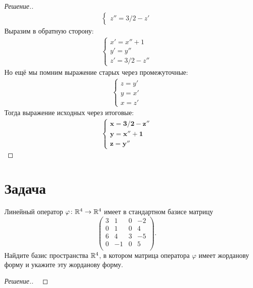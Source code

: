 \documentclass[a4paper]{article}
\theoremstyle{remark}
\begin{document}
\begin{proof}[Решение.]
\begin{align*}
\begin{cases}
            z'' = 3/2 - z'
          \end{cases}
        \end{align*}
        Выразим в обратную сторону:
        \begin{align*}
          \begin{cases}
            x' = x'' + 1 \\
            y' = y'' \\
            z' = 3/2 - z''
          \end{cases}
        \end{align*}
        Но ещё мы помним выражение старых через промежуточные:
        \begin{align*}
          \begin{cases}
            z = y' \\
            y = x' \\
            x = z'
          \end{cases}
        \end{align*}
        Тогда выражение исходных через итоговые:
        \begin{align*}
          \begin{cases}
            \bm{x = 3/2 - z''} \\
            \bm{y = x'' + 1} \\
            \bm{z = y''}
          \end{cases}
        \end{align*}        
        \end{proof}

    \section*{Задача }
        Линейный оператор $\varphi \colon \mathbb{R}^4 \to \mathbb{R}^4$ имеет в стандартном базисе матрицу
        $$
        \begin{pmatrix}
            3 & 1 & 0 & -2 \\
            0 & 1 & 0 & 4 \\
            6 & 4 & 3 & -5 \\
            0 & -1 & 0 & 5 \\
        \end{pmatrix}.
        $$
        Найдите базис пространства $\mathbb{R}^4$, в котором матрица оператора $\varphi$ 
        имеет жорданову форму и укажите эту жорданову форму.
        \begin{proof}[Решение.] \ 
            

        \end{proof}
      
\end{document}
